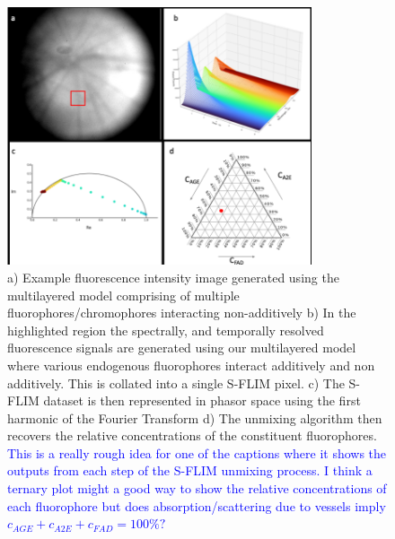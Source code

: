 \documentclass{optica-article}
\begin{document}
\begin{figure}[h!]
    \centering
    \includegraphics[width = 0.8\textwidth]{Figures/MockSFLIM2.png}
    \caption{a) Example fluorescence intensity image generated using the multilayered model comprising of multiple fluorophores/chromophores interacting non-additively  b) In the highlighted region the spectrally, and temporally resolved fluorescence signals are generated using our multilayered model where various endogenous fluorophores interact additively and non additively. This is collated into a single S-FLIM pixel. c) The S-FLIM dataset is then represented in phasor space using the first harmonic of the Fourier Transform d) The unmixing algorithm then recovers the relative concentrations of the constituent fluorophores.\\
    \textcolor{blue}{This is a really rough idea for one of the captions where it shows the outputs from each step of the S-FLIM unmixing process. I think a ternary plot might a good way to show the relative concentrations of each fluorophore but does absorption/scattering due to vessels imply $c_{AGE} + c_{A2E} + c_{FAD} = 100\%?$}}
    \label{fig:sflim}
\end{figure}
\end{document}
